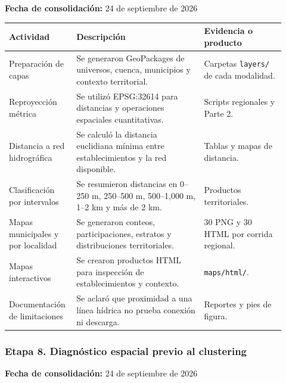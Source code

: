 \documentclass[
  spanish,
]{article}
\newcounter{none} %
\begin{document}
\textbf{Fecha de consolidación:} 24 de septiembre de 2026

{\def\LTcaptype{none} %
\begin{longtable}[]{@{}p{0.20\linewidth}p{0.44\linewidth}p{0.28\linewidth}@{}}
\toprule\noalign{}
Actividad & Descripción & Evidencia o producto \\
\midrule\noalign{}
\endhead
\bottomrule\noalign{}
\endlastfoot
Preparación de capas & Se generaron GeoPackages de universos, cuenca,
municipios y contexto territorial. & Carpetas \texttt{layers/} de cada
modalidad. \\
Reproyección métrica & Se utilizó EPSG:32614 para distancias y
operaciones espaciales cuantitativas. & Scripts regionales y Parte 2. \\
Distancia a red hidrográfica & Se calculó la distancia euclidiana mínima
entre establecimientos y la red disponible. & Tablas y mapas de
distancia. \\
Clasificación por intervalos & Se resumieron distancias en 0--250 m,
250--500 m, 500--1,000 m, 1--2 km y más de 2 km. & Productos
territoriales. \\
Mapas municipales y por localidad & Se generaron conteos,
participaciones, estratos y distribuciones territoriales. & 30 PNG y 30
HTML por corrida regional. \\
Mapas interactivos & Se crearon productos HTML para inspección de
establecimientos y contexto. & \texttt{maps/html/}. \\
Documentación de limitaciones & Se aclaró que proximidad a una línea
hídrica no prueba conexión ni descarga. & Reportes y pies de figura. \\
\end{longtable}
}

\subsubsection{Etapa 8. Diagnóstico espacial previo al
clustering}\label{etapa-8-diagnuxf3stico-espacial-previo-al-clustering}

\textbf{Fecha de consolidación:} 24 de septiembre de 2026
\end{document}
